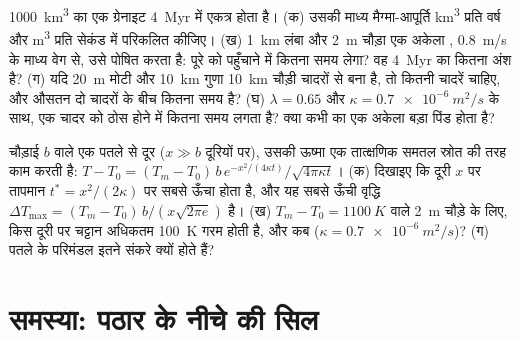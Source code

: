 \begin{exercise}[$\star\star\star$]\label{exo:b2:magma-emplacement:11}
\qty{1000}{km^3} का एक ग्रेनाइट  \qty{4}{Myr} में एकत्र होता है। (क)
उसकी माध्य मैग्मा-आपूर्ति \unit{km^3} प्रति वर्ष और \unit{m^3} प्रति सेकंड में परिकलित कीजिए। (ख)
\qty{1}{km} लंबा और \qty{2}{m} चौड़ा एक अकेला , \qty{0.8}{m/s} के माध्य वेग से,
उसे पोषित करता है: पूरे  को पहुँचाने में  कितना समय
लेगा? वह \qty{4}{Myr} का कितना अंश है? (ग) यदि 
\qty{20}{m} मोटी और \qty{10}{km} गुणा \qty{10}{km} चौड़ी चादरों से बना है, तो कितनी चादरें
चाहिए, और औसतन दो चादरों के बीच कितना समय है? (घ)
$\lambda = 0.65$ और $\kappa = \qty{0.7e-6}{m^2/s}$ के साथ, एक चादर को ठोस होने में कितना
समय लगता है? क्या  कभी  का एक अकेला बड़ा पिंड होता है?
\end{exercise}

\begin{exercise}[$\star\star\star$]\label{exo:b2:magma-emplacement:12}
चौड़ाई $b$ वाले एक पतले  से दूर ($x \gg b$ दूरियों पर), उसकी ऊष्मा एक
तात्क्षणिक समतल स्रोत की तरह काम करती है: $T - T_0 = (T_m - T_0)\,b\,e^{-x^2/(4\kappa
t)}/\sqrt{4\pi\kappa t}$। (क) दिखाइए कि दूरी $x$ पर तापमान
$t^* = x^2/(2\kappa)$ पर सबसे ऊँचा होता है, और यह सबसे ऊँची वृद्धि $\Delta T_{\max} = (T_m -
T_0)\,b/(x\sqrt{2\pi e})$ है। (ख) $T_m - T_0 =
\qty{1100}{K}$ वाले \qty{2}{m} चौड़े  के लिए, किस दूरी पर चट्टान अधिकतम \qty{100}{K} गरम होती है, और
कब ($\kappa = \qty{0.7e-6}{m^2/s}$)? (ग) पतले  के परिमंडल इतने
संकरे क्यों होते हैं?
\end{exercise}

\section{समस्या: पठार के नीचे की सिल}


